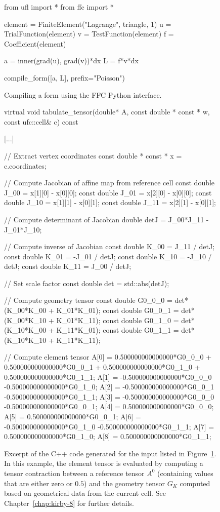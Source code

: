 \begin{figure}
  \begin{python}
from ufl import *
from ffc import *

element = FiniteElement("Lagrange", triangle, 1)
u = TrialFunction(element)
v = TestFunction(element)
f = Coefficient(element)

a = inner(grad(u), grad(v))*dx
L = f*v*dx

compile_form([a, L], prefix="Poisson")
  \end{python}
  \caption{Compiling a form using the FFC Python interface.}
  \label{fig:logg-1:python:form}
\end{figure}

\begin{figure}
  \begin{c++}
virtual void tabulate_tensor(double* A,
                             const double * const * w,
                             const ufc::cell& c) const
{
  [...]

  // Extract vertex coordinates
  const double * const * x = c.coordinates;

  // Compute Jacobian of affine map from reference cell
  const double J_00 = x[1][0] - x[0][0];
  const double J_01 = x[2][0] - x[0][0];
  const double J_10 = x[1][1] - x[0][1];
  const double J_11 = x[2][1] - x[0][1];

  // Compute determinant of Jacobian
  double detJ = J_00*J_11 - J_01*J_10;

  // Compute inverse of Jacobian
  const double K_00 =  J_11 / detJ;
  const double K_01 = -J_01 / detJ;
  const double K_10 = -J_10 / detJ;
  const double K_11 =  J_00 / detJ;

  // Set scale factor
  const double det = std::abs(detJ);

  // Compute geometry tensor
  const double G0_0_0 = det*(K_00*K_00 + K_01*K_01);
  const double G0_0_1 = det*(K_00*K_10 + K_01*K_11);
  const double G0_1_0 = det*(K_10*K_00 + K_11*K_01);
  const double G0_1_1 = det*(K_10*K_10 + K_11*K_11);

  // Compute element tensor
  A[0] = 0.500000000000000*G0_0_0
       + 0.500000000000000*G0_0_1
       + 0.500000000000000*G0_1_0
       + 0.500000000000000*G0_1_1;
  A[1] = -0.500000000000000*G0_0_0
         -0.500000000000000*G0_1_0;
  A[2] = -0.500000000000000*G0_0_1
         -0.500000000000000*G0_1_1;
  A[3] = -0.500000000000000*G0_0_0
         -0.500000000000000*G0_0_1;
  A[4] = 0.500000000000000*G0_0_0;
  A[5] = 0.500000000000000*G0_0_1;
  A[6] = -0.500000000000000*G0_1_0
         -0.500000000000000*G0_1_1;
  A[7] = 0.500000000000000*G0_1_0;
  A[8] = 0.500000000000000*G0_1_1;
}
  \end{c++}
  \caption{Excerpt of the C++ code generated for the input listed in
  Figure~\ref{fig:logg-1:python:form}. In this example, the element tensor is
  evaluated by computing a tensor contraction between a reference
  tensor $A^0$ (containing values that are either zero or $0.5$) and
  the geometry tensor $G_K$ computed based on geometrical data from
  the current cell. See Chapter~\ref{chap:kirby-8} for further details.}
  \label{fig:logg-1:formcode}
\end{figure}

